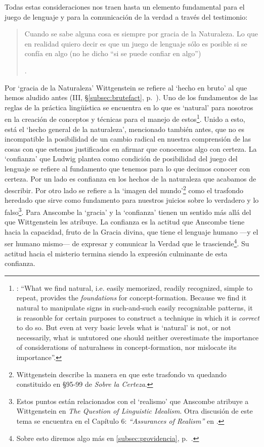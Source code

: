 Todas estas consideraciones nos traen hasta un elemento fundamental para el juego de lenguaje y para la comunicación de la verdad a través del testimonio: \blockquote[{\Cite[\S505; 509]{wittgenstein1969oncertes}}.]{Cuando se sabe alguna cosa es siempre por gracia de la Naturaleza. \textelp{} Lo que en realidad quiero decir es que un juego de lenguaje sólo es posible si se confía en algo (no he dicho ``si se puede confiar en algo'')}. Por `gracia de la Naturaleza' Wittgenstein se refiere al `hecho en bruto' al que hemos aludido antes (III, \S\ref{subsec:brutefact}, p.~\pageref{subsec:brutefact}). Uno de los fundamentos de las reglas de la práctica lingüística se encuentra en lo que es `natural' para nosotros en la creación de conceptos y técnicas para el manejo de estos\footnote{\Cite[Cf.][341]{bakerhacker2014rules}: \enquote{What we find natural, i.e. easily memorized, readily recognized, simple to repeat, provides the \emph{foundations} for concept-formation. Because we find it natural to manipulate signs in such-and-such easily recognizable patterns, it is reasonble for certain purposes to construct a technique in which it is \emph{correct} to do so. But even at very basic levels what is `natural' is not, or not necessarily, what is untutored \textelp{} one should neither overestimate the importance of considerations of naturalness in concept-formation, nor mislocate its importance}.}. Unido a esto, está el `hecho general de la naturaleza', mencionado también antes, que no es incompatible la posibilidad de un cambio radical en nuestra comprensión de las cosas con que estemos justificados en afirmar que conocemos algo con certeza. La `confianza' que Ludwig plantea como condición de posibilidad del juego del lenguaje se refiere al fundamento que tenemos para lo que decimos conocer con certeza. Por un lado es confianza en los hechos de la naturaleza que acabamos de describir. Por otro lado se refiere a la `imagen del mundo'\footnote{Wittgenstein describe la manera en que este trasfondo va quedando constituido en \S 95-99 de \emph{Sobre la Certeza}.} como el trasfondo heredado que sirve como fundamento para nuestros juicios sobre lo verdadero y lo falso\footnote{Estos puntos están relacionados con el `realismo' que Anscombe atribuye a Wittgenstein en \emph{The Question of Linguistic Idealism}. Otra discusión de este tema se encuentra en el Capítulo 6: \emph{``Assurances of Realism''} en \Cite[121-141]{kerr1997theo}.}.
Para Anscombe la `gracia' y la `confianza' tienen un sentido más allá del que Wittgenstein les atribuye. La confianza es la actitud que Anscombe tiene hacia la capacidad, fruto de la Gracia divina, que tiene el lenguaje humano ---y el ser humano mismo--- de expresar y comunicar la Verdad que le trasciende\footnote{Sobre esto diremos algo más en \ref{subsec:providencia}, p.~\pageref{subsec:providencia}.}. Su actitud hacia el misterio termina siendo la expresión culminante de esta confianza. 


